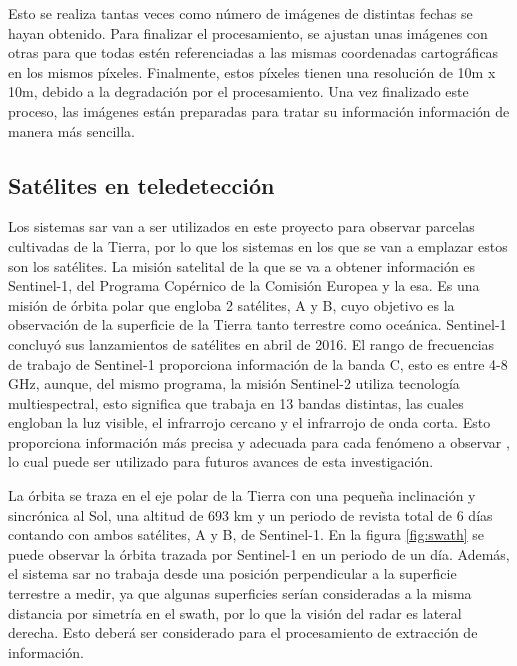 \par Esto se realiza tantas veces como número de imágenes de distintas fechas se hayan obtenido. Para finalizar el procesamiento, se ajustan unas imágenes con otras para que todas estén referenciadas a las mismas coordenadas cartográficas en los mismos píxeles. Finalmente, estos píxeles tienen una resolución de 10m x 10m, debido a la degradación por el procesamiento. Una vez finalizado este proceso, las imágenes están preparadas para tratar su información información de manera más sencilla. 

\subsection{Satélites en teledetección}
\par Los sistemas \gls{sar} van a ser utilizados en este proyecto para observar parcelas cultivadas de la Tierra, por lo que los sistemas en los que se van a emplazar estos son los satélites. La misión satelital de la que se va a obtener información es Sentinel-1, del Programa Copérnico de la Comisión Europea y la \gls{esa}. Es una misión de órbita polar que engloba 2 satélites, A y B, cuyo objetivo es la observación de la superficie de la Tierra tanto terrestre como oceánica. Sentinel-1 concluyó sus lanzamientos de satélites en abril de 2016.  El rango de frecuencias de trabajo de Sentinel-1  proporciona información de la banda C, esto es entre 4-8 GHz, aunque, del mismo programa, la misión Sentinel-2 utiliza tecnología multiespectral, esto significa que trabaja en 13 bandas distintas, las cuales engloban la luz visible, el infrarrojo cercano y el infrarrojo de onda corta. Esto proporciona información más precisa y adecuada para cada fenómeno a observar \cite{copernicusOV}, lo cual puede ser utilizado para futuros avances de esta investigación. 
\\
\par La órbita se traza en el eje polar de la Tierra con una pequeña inclinación y sincrónica al Sol, una altitud de 693 km y un periodo de revista total de 6 días contando con ambos satélites, A y B, de Sentinel-1. En la figura \ref{fig:swath} se puede observar la órbita trazada por Sentinel-1 en un periodo de un día. Además, el sistema \gls{sar} no trabaja desde una posición perpendicular a la superficie terrestre a medir, ya que algunas superficies serían consideradas a la misma distancia por simetría en el swath, por lo que la visión del radar es lateral derecha. Esto deberá ser considerado para el procesamiento de extracción de información. 
